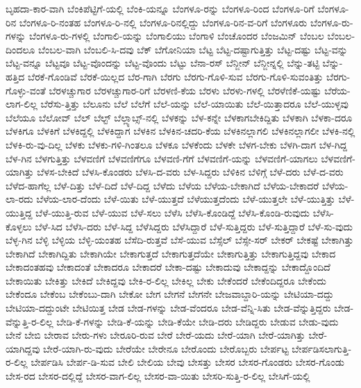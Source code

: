 {ಬೃಹದಾ-ಕಾರ-ವಾಗಿ
ಬೆಂಕಿಪೆಟ್ಟಿಗೆ-ಯಲ್ಲಿ
ಬೆಂಕಿ-ಯನ್ನೂ
ಬೆಂಗಳೂ-ರನ್ನು
ಬೆಂಗಳೂ-ರಿಂದ
ಬೆಂಗಳೂ-ರಿಗೆ
ಬೆಂಗಳೂ-ರಿನ
ಬೆಂಗಳೂ-ರಿ-ನಂತಹ
ಬೆಂಗಳೂ-ರಿ-ನಲ್ಲಿ
ಬೆಂಗಳೂ-ರಿನಲ್ಲಿದ್ದು
ಬೆಂಗಳೂ-ರಿನ-ವ-ರಿಗೆ
ಬೆಂಗಳೂರು
ಬೆಂಗಳೂ-ರು-ಗಳನ್ನು
ಬೆಂಗಳೂ-ರು-ಗಳಲ್ಲಿ
ಬೆಂಗಾಲಿ-ಯನ್ನು
ಬೆಂಗಾಲಿಯು
ಬೆಂಗಾಳಿ
ಬೆಂಚೊಂದರ
ಬೆಂಜಮಿನ್
ಬೆಂಬಲ
ಬೆಂಬಲ-ದಿಂದಲೂ
ಬೆಂಬಲ-ವಾಗಿ
ಬೆಂಬಲಿ-ಸಿ-ದವು
ಬೆಕ್
ಬೆಗೋನಿಯಾ
ಬೆಟ್ಟ
ಬೆಟ್ಟ-ದಷ್ಟಾಗುತ್ತಿತ್ತು
ಬೆಟ್ಟ-ದಷ್ಟು
ಬೆಟ್ಟ-ವನ್ನು
ಬೆಟ್ಟ-ವನ್ನೂ
ಬೆಟ್ಟವೂ
ಬೆಟ್ಟ-ವೊಂದನ್ನು
ಬೆಟ್ಟ-ವೊಂದು
ಬೆಟ್ಟು
ಬೆನಾ-ರಸ್
ಬೆನ್ಜೀನ್
ಬೆನ್ಜೀನ್ನಲ್ಲಿ
ಬೆನ್ನು-ತಟ್ಟಿ
ಬೆನ್ನು-ಹತ್ತಿದ
ಬೆರಕೆ-ಗೊಂಡಿವೆ
ಬೆರಕೆ-ಯಿಲ್ಲದ
ಬೆರ-ಗಾಗಿ
ಬೆರಗು
ಬೆರಗು-ಗೊಳಿ-ಸುವ
ಬೆರಗು-ಗೊಳಿ-ಸುವಂತಿತ್ತು
ಬೆರಗು-ಗೊಳ್ಳು-ವಂತೆ
ಬೆರಳಚ್ಚುಗಾರ
ಬೆರಳಚ್ಚುಗಾರ-ರಿಗೆ
ಬೆರಳಣಿ-ಕೆಯ
ಬೆರಳು
ಬೆರಳು-ಗಳಲ್ಲಿ
ಬೆರಳೆಣಿಕೆ-ಯಷ್ಟು
ಬೆರೆಯ-ಲಾಗ-ಲಿಲ್ಲ
ಬೆರೆಸು-ತ್ತಿತ್ತು
ಬೆಲೂನು
ಬೆಲೆ
ಬೆಲೆಗೆ
ಬೆಲೆ-ಯನ್ನು
ಬೆಲೆ-ಯಾಯಿತು
ಬೆಲೆ-ಯಿತ್ತಾದರೂ
ಬೆಲೆ-ಯುಳ್ಳವು
ಬೆಲೆಯೂ
ಬೆಲೋವ್
ಬೆಲ್
ಬೆಲ್ಟ್
ಬೆಲ್ಲ್ಯಾಬ್ಸ್-ನಲ್ಲಿ
ಬೆಳಕನ್ನು
ಬೆಳ-ಕನ್ನೇ
ಬೆಳಕಾಗಬೇಕಿದ್ದಿತು
ಬೆಳಕಾಗಿ
ಬೆಳಕಾ-ದರೂ
ಬೆಳಕಿಗೂ
ಬೆಳಕಿಗೆ
ಬೆಳಕಿದ್ದಲ್ಲಿ
ಬೆಳಕಿದ್ದಾಗ
ಬೆಳಕಿನ
ಬೆಳಕಿನ-ಚದರಿ-ಕೆಯ
ಬೆಳಕಿನಲ್ಲಾಗಲಿ
ಬೆಳಕಿನಲ್ಲಾಗಲೀ
ಬೆಳಕಿ-ನಲ್ಲಿ
ಬೆಳಕಿ-ರು-ವು-ದಿಲ್ಲ
ಬೆಳಕು
ಬೆಳಕು-ಗಳಿ-ಗಿಂತಲೂ
ಬೆಳಕೂ
ಬೆಳಕೆಂದು
ಬೆಳಕೇ
ಬೆಳಗ-ಬೇಕು
ಬೆಳಗಿ-ದಾಗ
ಬೆಳ-ಗಿದ್ದ
ಬೆಳ-ಗಿನ
ಬೆಳಗುತ್ತಿತ್ತು
ಬೆಳವಣಿಗೆ
ಬೆಳವಣಿಗೆಗೂ
ಬೆಳವಣಿ-ಗೆಗೆ
ಬೆಳವಣಿಗೆ-ಯನ್ನು
ಬೆಳವಣಿಗೆ-ಯಾಗಲು
ಬೆಳವಣಿಗೆ-ಯಾಗಿತ್ತು
ಬೆಳಸ-ಬೇಕಿದೆ
ಬೆಳಸಿ-ಕೊಂಡರು
ಬೆಳಸಿ-ದ-ವರು
ಬೆಳ-ಸಿದ್ದರು
ಬೆಳಿಕಿನ
ಬೆಳಿಗ್ಗೆ
ಬೆಳೆ-ದರು
ಬೆಳೆ-ದ-ವರು
ಬೆಳೆದ-ಹಾಗೆಲ್ಲ
ಬೆಳೆ-ದಿತ್ತು
ಬೆಳೆ-ದಿದೆ
ಬೆಳೆ-ದಿದ್ದ
ಬೆಳೆದು
ಬೆಳೆಯ
ಬೆಳೆಯ-ಬೇಕಾಗಿದೆ
ಬೆಳೆಯ-ಬೇಕಾದರೆ
ಬೆಳೆಯ-ಲಾ-ರದು
ಬೆಳೆಯ-ಲಾರ-ದೆಂದು
ಬೆಳೆ-ಯಿತು
ಬೆಳೆ-ಯುತ್ತದೆ
ಬೆಳೆಯುತ್ತದೆಂದು
ಬೆಳೆ-ಯುತ್ತಲೇ
ಬೆಳೆ-ಯುತ್ತಿತ್ತು
ಬೆಳೆ-ಯುತ್ತಿದ್ದ
ಬೆಳೆ-ಯುತ್ತಿ-ರುವ
ಬೆಳೆ-ಯುವ
ಬೆಳೆ-ಸಲು
ಬೆಳೆಸಿ
ಬೆಳೆಸಿ-ಕೊಂಡಿದ್ದೆ
ಬೆಳೆಸಿ-ಕೊಂಡಿ-ರುವುದು
ಬೆಳೆಸಿ-ಕೊಳ್ಳಲು
ಬೆಳೆ-ಸಿದ
ಬೆಳೆಸಿ-ದರು
ಬೆಳೆ-ಸಿದ್ದ
ಬೆಳೆಸಿದ್ದರು
ಬೆಳೆಸಿದ್ದಾರೆ
ಬೆಳೆ-ಸುತ್ತಿದ್ದರು
ಬೆಳೆ-ಸುತ್ತಿದ್ದಾರೆ
ಬೆಳೆ-ಸು-ವುದು
ಬೆಳ್ಳ-ಗಿನ
ಬೆಳ್ಳಿ
ಬೆಳ್ಳಿಯ
ಬೆಳ್ಳಿ-ಯಂತಹ
ಬೆಸೆದಿ-ರುತ್ತವೆ
ಬೆಸೆ-ಯುವ
ಬೆಸ್ಸೆಲ್
ಬೆಸ್ಸೇ-ಸರ್
ಬೇಕರ್
ಬೇಕಷ್ಟೆ
ಬೇಕಾಗಿತ್ತು
ಬೇಕಾಗಿದೆ
ಬೇಕಾಗಿದ್ದಿತು
ಬೇಕಾಗಿಯೇ
ಬೇಕಾಗುತ್ತದೆ
ಬೇಕಾಗುತ್ತದೆಯೇ
ಬೇಕಾಗುತ್ತಿತ್ತು
ಬೇಕಾಗುತ್ತಿದ್ದವು
ಬೇಕಾದ
ಬೇಕಾದಂತಹವು
ಬೇಕಾದಂತೆ
ಬೇಕಾದರೂ
ಬೇಕಾದರೆ
ಬೇಕಾ-ದಷ್ಟು
ಬೇಕಾದುವು
ಬೇಕಾದ್ದನ್ನು
ಬೇಕಾದ್ದೊಂದಿದೆ
ಬೇಕಾಯಿತು
ಬೇಕಿತ್ತು
ಬೇಕಿದೆ
ಬೇಕಿದ್ದವು
ಬೇಕಿ-ರ-ಲಿಲ್ಲ
ಬೇಕಿಲ್ಲ
ಬೇಕು
ಬೇಕೆಂದರೆ
ಬೇಕೆಂದಿದ್ದರೂ
ಬೇಕೆಂದು
ಬೇಕೆಂದೂ
ಬೇಕೆಂಬ
ಬೇಕೆಂಬು-ದಾಗಿ
ಬೇಕೋ
ಬೇಗ
ಬೇಗನೆ
ಬೇಗನೇ
ಬೇಜವಾಬ್ದಾರಿ-ಯನ್ನು
ಬೇಟಿಯಾ-ದದ್ದು
ಬೇಟಿಯಾ-ದದ್ದುಂಟೇ
ಬೇಟಿಯಿತ್ತ
ಬೇಡ
ಬೇಡ-ಗಳನ್ನು
ಬೇಡ-ವೆಂದರೂ
ಬೇಡ-ವೆನ್ನಿ-ಸಿತು
ಬೇಡ-ವೆನ್ನುತ್ತಿದ್ದರು
ಬೇಡ-ವೆನ್ನುತ್ತಿ-ರ-ಲಿಲ್ಲ
ಬೇಡಿ-ಕೆ-ಗಳನ್ನು
ಬೇಡಿ-ಕೆ-ಯನ್ನು
ಬೇಡಿ-ಕೆಯೇ
ಬೇಡಿ-ದರು
ಬೇಡಿದ್ದರು
ಬೇಡುವ
ಬೇಡು-ವುದು
ಬೇನೆ
ಬೇಬಿ
ಬೇರಾವ
ಬೇರು-ಗಳು
ಬೇರೂರಿ-ರುವ
ಬೇರೆ
ಬೇರೆ-ಯದು
ಬೇರೆ-ಯಾಗಿ
ಬೇರೆ-ಯಾಗಿತ್ತು
ಬೇರೆ-ಯಾಗಿದ್ದವು
ಬೇರೆ-ಯಾಗಿ-ರು-ವುದು
ಬೇರೆಯೇ
ಬೇರೇನೂ
ಬೇರೊಂದು
ಬೇರೊಬ್ಬರು
ಬೇರ್ಪಟ್ಟ
ಬೇರ್ಪಡಿಸಲಾಗುತ್ತಿ-ರ-ಲಿಲ್ಲ
ಬೇರ್ಪಡಿಸಿ
ಬೇರ್ಪ-ಡಿ-ಸುವ
ಬೇಲಿ
ಬೇಲಿಯ
ಬೇವು
ಬೇಸತ್ತು
ಬೇಸರ
ಬೇಸರ-ಗೊಂಡರು
ಬೇಸರ-ಗೊಂಡು
ಬೇಸ-ರದ
ಬೇಸರ-ದಲ್ಲಿದ್ದೆ
ಬೇಸರ-ವಾಗ-ಲಿಲ್ಲ
ಬೇಸರ-ವಾ-ಯಿತು
ಬೇಸರಿ-ಸುತ್ತಿ-ರ-ಲಿಲ್ಲ
ಬೇಸಿಗೆ-ಯಲ್ಲಿ
}
